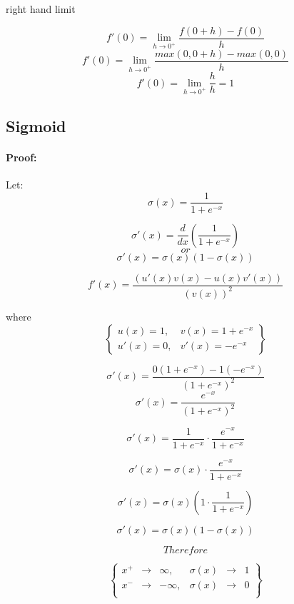 \documentclass[12pt,a4paper]{article}
\begin{document}
    \newpage
    \begin{center}
    right hand limit
    \end{center}
    \[
    f'(0) = \lim_{h \to 0^+} \frac{f(0 + h) - f(0)}{h}
    \]
    \[
    f'(0) = \lim_{h \to 0^+} \frac{max(0, 0 + h) - max(0, 0)}{h}
    \]
    \[
    f'(0) = \lim_{h \to 0^+} \frac{h}{h} = 1
    \]

\subsection{Sigmoid}
\paragraph{Proof:}

\begin{flushleft}
    Let:
    \[
    \sigma(x) = \frac{1}{1 + e^{-x}}
    \]

    \[
    \sigma'(x) = \frac{d}{dx} \left( \frac{1}{1 + e^{-x}} \right)
    \]
    \[
    or
    \]
    \[
    \sigma'(x) = \sigma(x) (1 - \sigma(x))
    \]
\end{flushleft}
\vspace{0.5cm}

\[
f'(x) = \frac{(u'(x)v(x) - u(x)v'(x))}{(v(x))^2}
\]

\begin{center}
    where
    \[
    \begin{Bmatrix}
        u(x) = 1, & v(x) = 1 + e^{-x} \\
        u'(x) = 0, & v'(x) = -e^{-x}
    \end{Bmatrix}
    \]
\end{center}

\[
\sigma'(x) = \frac{0(1 + e^{-x}) - 1(-e^{-x})}{(1 + e^{-x})^2}
\]
\[
\sigma'(x) = \frac{e^{-x}}{(1 + e^{-x})^2}
\]

\[
\sigma'(x) = \frac{1}{1 + e^{-x}} \cdot \frac{e^{-x}}{1 + e^{-x}}
\]

\[
\sigma'(x) = \sigma(x) \cdot {\frac{e^{-x}}{1 + e^{-x}}}
\]

\[
\sigma'(x) = \sigma(x) (1 \cdot \frac{1}{1 + e^{-x}})
\]

\[
\sigma'(x) = \sigma(x) (1 - \sigma(x))
\]

\vspace{1cm}
\[
Therefore
\]

\[
\begin{Bmatrix}
    x^{+} & \to & \infty, & \sigma(x) & \to & 1 \\
    x^{-} & \to & -\infty, & \sigma(x) & \to & 0 \\
\end{Bmatrix}
\]
\end{document}
